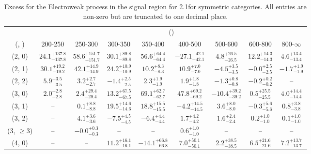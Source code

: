 \begin{table}[h!]
\tiny
\centering
\caption{Excess for the Electroweak process in the signal region for 2.1\ifb for symmetric categories. All entries are non-zero but are truncated to one decimal place.\label{tab:excesssep_sig_ewk_sym}}
\begin{tabular}
{ccccccccc}
	\hline\hline
	& \multicolumn{8}{c}{\scalht (\gev)} \\ 
	 (\njet,  \nb) & 200-250 & 250-300 & 300-350 & 350-400 & 400-500 & 500-600 & 600-800 & 800-$\infty$ \\ [0.8ex] 
\hline
	(2, 0) & $24.1^{+ 137.8 }_{- 137.8 }$ & $58.6^{+ 151.7 }_{- 151.7 }$ & $30.1^{+ 89.8 }_{- 89.8 }$ & $56.6^{+ 64.4 }_{- 64.4 }$ & $-27.1^{+ 42.1 }_{- 42.1 }$ & $4.8^{+ 26.5 }_{- 26.5 }$ & $12.2^{+ 14.3 }_{- 14.3 }$ & $4.6^{+ 13.4 }_{- 13.4 }$ \\[0.5ex] 
	(2, 1) & $30.1^{+ 19.2 }_{- 19.2 }$ & $42.1^{+ 14.9 }_{- 14.9 }$ & $24.2^{+ 10.9 }_{- 10.9 }$ & $10.2^{+ 8.3 }_{- 8.3 }$ & $10.9^{+ 7.0 }_{- 7.0 }$ & $-4.5^{+ 3.5 }_{- 3.5 }$ & $-0.0^{+ 2.5 }_{- 2.5 }$ & $-1.7^{+ 1.9 }_{- 1.9 }$ \\[0.5ex] 
	(2, 2) & $5.9^{+ 3.5 }_{- 3.5 }$ & $3.2^{+ 2.7 }_{- 2.7 }$ & $-1.4^{+ 2.5 }_{- 2.5 }$ & $2.3^{+ 1.9 }_{- 1.9 }$ & $1.9^{+ 1.8 }_{- 1.8 }$ & $-1.3^{+ 0.8 }_{- 0.8 }$ & $-0.2^{+ 0.2 }_{- 0.2 }$ & -- \\[0.5ex] 
	(3, 0) & $2.0^{+ 2.8 }_{- 2.8 }$ & $2.4^{+ 29.4 }_{- 29.4 }$ & $13.2^{+ 67.5 }_{- 67.5 }$ & $69.1^{+ 62.7 }_{- 62.7 }$ & $47.8^{+ 69.2 }_{- 69.2 }$ & $-10.4^{+ 39.2 }_{- 39.2 }$ & $0.5^{+ 25.5 }_{- 25.5 }$ & $4.0^{+ 14.4 }_{- 14.4 }$ \\[0.5ex] 
	(3, 1) & -- & $0.1^{+ 8.8 }_{- 8.8 }$ & $19.5^{+ 14.6 }_{- 14.6 }$ & $18.8^{+ 15.5 }_{- 15.5 }$ & $-4.2^{+ 14.5 }_{- 14.5 }$ & $3.6^{+ 8.0 }_{- 8.0 }$ & $-0.3^{+ 5.6 }_{- 5.6 }$ & $0.8^{+ 3.8 }_{- 3.8 }$ \\[0.5ex] 
	(3, 2) & -- & $4.1^{+ 3.6 }_{- 3.6 }$ & $-7.5^{+ 4.5 }_{- 4.5 }$ & $-6.4^{+ 4.4 }_{- 4.4 }$ & $1.7^{+ 4.2 }_{- 4.2 }$ & $1.6^{+ 2.4 }_{- 2.4 }$ & $0.2^{+ 1.0 }_{- 1.0 }$ & $0.1^{+ 1.0 }_{- 1.0 }$ \\[0.5ex] 
	(3, $\ge3$) & -- & $-0.0^{+ 0.3 }_{- 0.3 }$ & -- & -- & $0.6^{+ 1.0 }_{- 1.0 }$ & -- & -- & -- \\[0.5ex] 
	(4, 0) & -- & -- & $11.2^{+ 16.1 }_{- 16.1 }$ & $-14.1^{+ 66.8 }_{- 66.8 }$ & $7.0^{+ 50.1 }_{- 50.1 }$ & $2.2^{+ 38.5 }_{- 38.5 }$ & $6.5^{+ 21.6 }_{- 21.6 }$ & $7.2^{+ 13.7 }_{- 13.7 }$ \\[0.5ex] 

\end{tabular}
\end{table}
